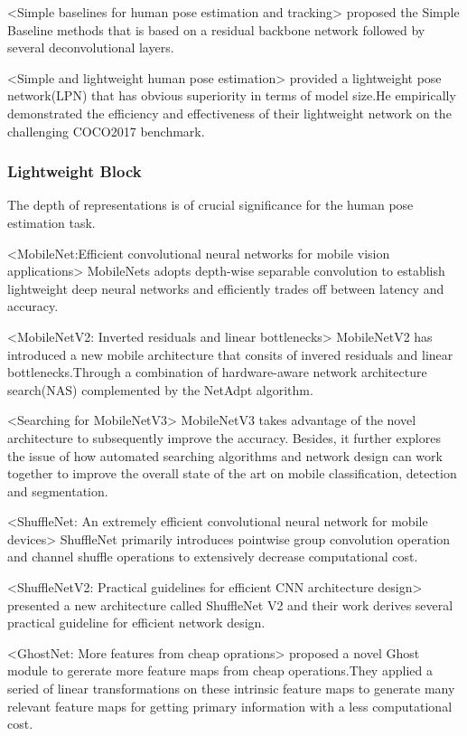 \documentclass[11pt]{article}
\begin{document}
<Simple baselines for human pose estimation and tracking> proposed the Simple Baseline methods that is based on a residual backbone network followed by several deconvolutional layers.

<Simple and lightweight human pose estimation> provided a lightweight pose network(LPN) that has obvious superiority in terms of model size.He empirically demonstrated the efficiency and effectiveness of their lightweight network on the challenging COCO2017 benchmark.

\subsubsection{Lightweight Block}
The depth of representations is of crucial significance for the human pose estimation task.

<MobileNet:Efficient convolutional neural networks for mobile vision applications> MobileNets adopts depth-wise separable convolution to establish lightweight deep neural networks and efficiently trades off between latency and accuracy.

<MobileNetV2: Inverted residuals and linear bottlenecks> MobileNetV2 has introduced a new mobile architecture that consits of invered residuals and linear bottlenecks.Through a combination of hardware-aware network architecture search(NAS) complemented by the NetAdpt algorithm.

<Searching for MobileNetV3> MobileNetV3 takes advantage of the novel architecture to subsequently improve the accuracy. Besides, it further explores the issue of how automated searching algorithms and network design can work together to improve the overall state of the art on mobile classification, detection and segmentation.

<ShuffleNet: An extremely efficient convolutional neural network for mobile devices> ShuffleNet primarily introduces pointwise group convolution operation and channel shuffle operations to extensively decrease computational cost.

<ShuffleNetV2: Practical guidelines for efficient CNN architecture design> presented a new architecture called ShuffleNet V2 and their work derives several practical guideline for efficient network design.

<GhostNet: More features from cheap oprations> proposed a novel Ghost module to gererate more feature maps from cheap operations.They applied a seried of linear transformations on these intrinsic feature maps to generate many relevant feature maps for getting primary information with a less computational cost.
\end{document}
